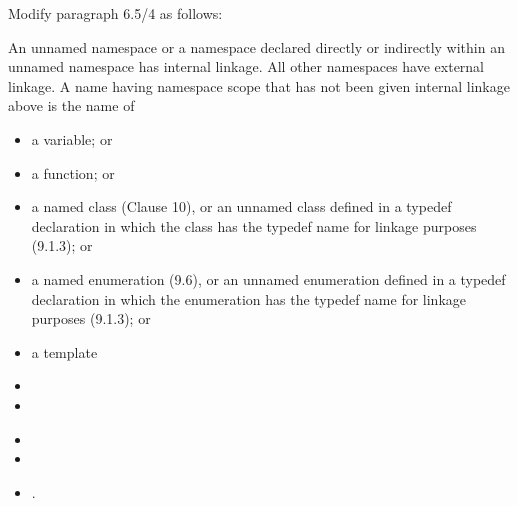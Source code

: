 Modify paragraph 6.5/4 as follows:

\begin{std.txt}
  \pnum[4]
  An unnamed namespace or a namespace declared directly or
  indirectly within an unnamed namespace has internal linkage. All other
  namespaces have external linkage.
  A name having namespace scope that has
  not been given internal linkage above  is the name of
  \begin{itemize}
    \item a variable; or
    \item a function; or
    \item a named class (Clause 10), or an unnamed class defined in a
    typedef declaration in which the class has the typedef name for
    linkage purposes (9.1.3); or
    \item a named enumeration (9.6), or an unnamed enumeration defined in
    a typedef declaration in which the enumeration has the typedef name for
    linkage purposes (9.1.3); or
    \item a template
  \end{itemize}
  \begin{before}\color{addclr}
    \begin{itemize}
      \item {}
      \item {}
    \end{itemize}
  \end{before}
  \begin{after}\color{addclr}
    \begin{itemize}\color{addclr}
      \item {}
      \item {}
      \item {}.
    \end{itemize}
  \end{after}
\end{std.txt}

